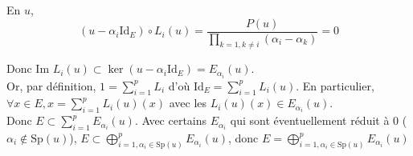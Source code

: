 \documentclass[]{article}
\begin{document}
\begin{itemize}
    En $u$,
    \[(u - \alpha_i \text{Id}_E) \circ L_i (u) = \frac{P(u)}{\prod_{k=1, k \neq i}(\alpha_i - \alpha_k)} = 0\]

    Donc $\text{Im } L_i(u) \subset \ker (u-\alpha_i \text{Id}_E) = E_{\alpha_i}(u)$. \\

    Or, par définition, $1 = \sum_{i=1}^{p} L_i$ d'où $\text{Id}_E = \sum_{i=1}^{p} L_i(u)$. En particulier, $\forall x \in E, x = \sum_{i=1}^{p} L_i(u)(x)$ avec les $L_i(u)(x) \in E_{\alpha_i}(u)$. \\

    Donc $E \subset \sum_{i=1}^p E_{\alpha_i}(u)$. Avec certains $E_{\alpha_i}$ qui sont éventuellement réduit à 0 ($\alpha_i \not \in \text{Sp}(u)$), $E \subset \bigoplus_{i=1, \alpha_i \in \text{Sp}(u)}^p E_{\alpha_i}(u)$, donc $E = \bigoplus_{i=1, \alpha_i \in \text{Sp}(u)}^p E_{\alpha_i}(u)$
\end{itemize}
\end{document}
